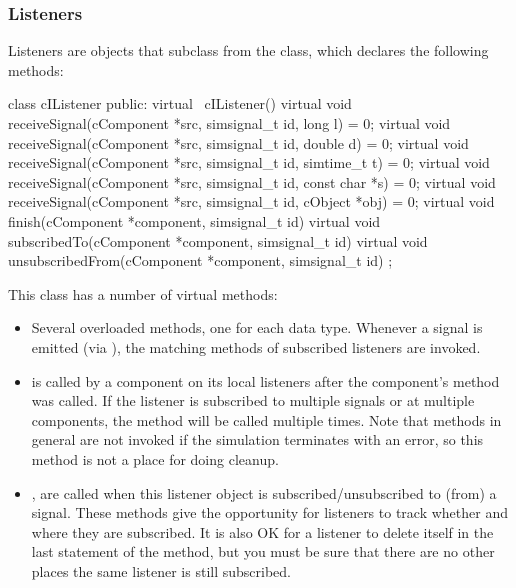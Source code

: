 \subsubsection{Listeners}

Listeners are objects that subclass from the  class, which
declares the following methods:

\begin{cpp}
class cIListener
{
  public:
    virtual ~cIListener() {}
    virtual void receiveSignal(cComponent *src, simsignal_t id, long l) = 0;
    virtual void receiveSignal(cComponent *src, simsignal_t id, double d) = 0;
    virtual void receiveSignal(cComponent *src, simsignal_t id, simtime_t t) = 0;
    virtual void receiveSignal(cComponent *src, simsignal_t id, const char *s) = 0;
    virtual void receiveSignal(cComponent *src, simsignal_t id, cObject *obj) = 0;
    virtual void finish(cComponent *component, simsignal_t id) {}
    virtual void subscribedTo(cComponent *component, simsignal_t id) {}
    virtual void unsubscribedFrom(cComponent *component, simsignal_t id) {}
};
\end{cpp}

This class has a number of virtual methods:

\begin{itemize}
  \item Several overloaded  methods, one for each
    data type. Whenever a signal is emitted (via ),
    the matching  methods of subscribed listeners
    are invoked.
  \item {} is called by a component on its local listeners
    after the component's  method was called. If the listener
    is subscribed to multiple signals or at multiple components, the method
    will be called multiple times. Note that  methods in general
    are not invoked if the simulation terminates with an error, so this method
    is not a place for doing cleanup.
  \item {},  are called
    when this listener object is subscribed/unsubscribed to (from) a signal.
    These methods give the opportunity for listeners to track whether
    and where they are subscribed. It is also OK for a listener to delete
    itself in the last statement of the  method,
    but you must be sure that there are no other places the same listener
    is still subscribed.
\end{itemize}

